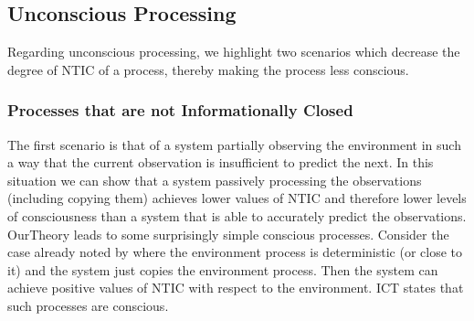 \documentclass[utf8]{article}
\begin{document}
        \subsection{Unconscious Processing}
            Regarding unconscious processing, we highlight two scenarios which decrease the degree of NTIC of a process, thereby making the process less conscious.
        
            \subsubsection*{Processes that are not Informationally Closed}\label{sec:reflexive}
             The first scenario is that of a system partially observing the environment in such a way that the current observation is insufficient to predict the next. In this situation we can show that a system passively processing the observations (including copying them) achieves lower values of NTIC and therefore lower levels of consciousness than a system that is able to accurately predict the observations. 
            \ac{OurTheory} leads to some surprisingly simple conscious processes. Consider the case already noted by \citet{BERTSCHINGER.2006} where the environment process is deterministic (or close to it) and the system just copies the environment process. Then the system can achieve positive values of NTIC with respect to the environment. ICT states that such processes are conscious. 
            
\end{document}
